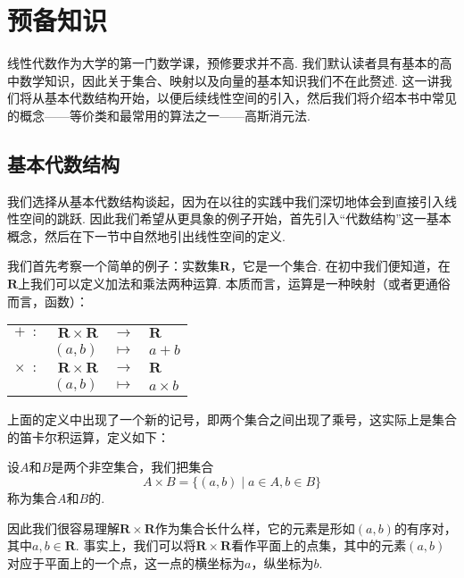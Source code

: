 \chapter{预备知识}

线性代数作为大学的第一门数学课，预修要求并不高. 我们默认读者具有基本的高中数学知识，因此关于集合、映射以及向量的基本知识我们不在此赘述. 这一讲我们将从基本代数结构开始，以便后续线性空间的引入，然后我们将介绍本书中常见的概念——等价类和最常用的算法之一——高斯消元法.

\section{基本代数结构}

我们选择从基本代数结构谈起，因为在以往的实践中我们深切地体会到直接引入线性空间的跳跃. 因此我们希望从更具象的例子开始，首先引入``代数结构''这一基本概念，然后在下一节中自然地引出线性空间的定义.

我们首先考察一个简单的例子：实数集$\mathbf{R}$，它是一个集合. 在初中我们便知道，在$\mathbf{R}$上我们可以定义加法和乘法两种运算. 本质而言，运算是一种映射（或者更通俗而言，函数）：

\begin{center}
    \begin{tabular}{rrcl}
        $+\enspace\colon$      & $\mathbf{R}\times\mathbf{R}$ & $\to$     & $\mathbf{R}$ \\
                               & $(a,b)$                      & $\mapsto$ & $a+b$        \\
        $\times\enspace\colon$ & $\mathbf{R}\times\mathbf{R}$ & $\to$     & $\mathbf{R}$ \\
                               & $(a,b)$                      & $\mapsto$ & $a\times b$
    \end{tabular}
\end{center}

上面的定义中出现了一个新的记号，即两个集合之间出现了乘号，这实际上是集合的笛卡尔积运算，定义如下：

\begin{definition}[笛卡尔积] 
    设$A$和$B$是两个非空集合，我们把集合
    \[A\times B=\{(a,b) \mid a\in A, b\in B\}\]
    称为集合$A$和$B$的.
\end{definition}

因此我们很容易理解$\mathbf{R}\times\mathbf{R}$作为集合长什么样，它的元素是形如$(a,b)$的有序对，其中$a,b\in\mathbf{R}$. 事实上，我们可以将$\mathbf{R}\times\mathbf{R}$看作平面上的点集，其中的元素$(a,b)$对应于平面上的一个点，这一点的横坐标为$a$，纵坐标为$b$.


